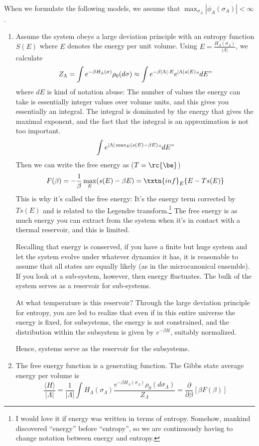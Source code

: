 When we formulate the following models, we assume that $\max_{\sigma_A} |\phi_A(\sigma_A)| < \infty$. 

\begin{enumerate}
 
\item Assume the system obeys a large deviation principle with an entropy function $S(E) $ where $E$ denotes the energy per unit volume. Using $E = \frac{H_{\Lambda}(\sigma_{\Lambda})}{|\Lambda|}$, we calculate
\[
Z_{\Lambda} = \int e^{-\beta H_{\Lambda}(\sigma)}\rho_0(d\sigma) \approx \int e^{-\beta|\Lambda|\cdot E} e^{|\Lambda|s(E)} ``dE\text{''}
\]
where $dE$ is kind of notation abuse: The number of values the energy can take is essentially integer values over volume units, and this gives you essentially an integral. %
The integral is dominated by the energy that gives the maximal exponent, and the fact that the integral is an approximation is not too important.
\[
\int e^{|\Lambda|\max_E(s(E) - \beta E)}``dE\text{''}
\]
Then we can write the free energy as ($T=\rc{\be}$)
\[
F(\beta) = - \frac{1}{\beta} \max_E(s(E) - \beta E) = \txtn{inf}_E\{E - Ts(E)\}
\]
This is why it's called the free energy: It's the energy term corrected by $Ts(E)$ and is related to the Legendre transform.\footnote{I would love it if energy was written in terms of entropy. Somehow, mankind discovered ``energy'' before ``entropy'', so we are continuously having to change notation between energy and entropy.} The free energy is as much energy you can extract from the system when it's in contact with a thermal reservoir, and this is limited. 

Recalling that energy is conserved, if you have a finite but huge system and let the system evolve under whatever dynamics it has, it is reasonable to assume that all states are equally likely (as in the microcanonical ensemble). If you look at a sub-system, however, then energy fluctuates. The bulk of the system serves as a reservoir for sub-systems. 

At what temperature is this reservoir? Through the large deviation principle for entropy, you are led to realize that even if in this entire universe the energy is fixed, for subsystems, the energy is not constrained, and the distribution within the subsystem is given by $e^{-\beta H}$, suitably normalized. 

Hence, systems serve as the reservoir for the subsystems. 

\item The free energy function is a generating function. The Gibbs state average energy per volume is 
\[
\frac{\langle H \rangle}{|\Lambda|} = \frac{1}{|\Lambda|} \int H_{\Lambda}(\sigma_{\Lambda}) \frac{e^{-\beta H_{\Lambda}(\sigma_{\Lambda})} \rho_0(d\sigma_{\Lambda})}{Z_{\Lambda}} = \frac{\partial}{\partial\beta}\left[\beta F(\beta)\right]
\]


\end{enumerate}
